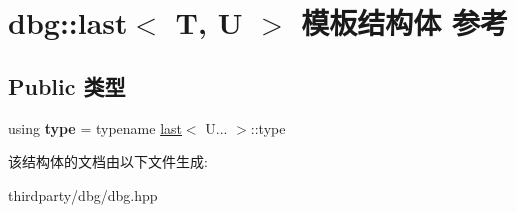 \hypertarget{structdbg_1_1last}{}\section{dbg\+:\+:last$<$ T, U $>$ 模板结构体 参考}
\label{structdbg_1_1last}
\subsection*{Public 类型}
\begin{DoxyCompactItemize}
\item 
\mbox{\label{structdbg_1_1last_aac2d6dd66fecfc0f3f37ecb4a02b0779}} 
using {\bfseries type} = typename \hyperlink{structdbg_1_1last}{last}$<$ U... $>$\+::type
\end{DoxyCompactItemize}


该结构体的文档由以下文件生成\+:\begin{DoxyCompactItemize}
\item 
thirdparty/dbg/dbg.\+hpp\end{DoxyCompactItemize}
